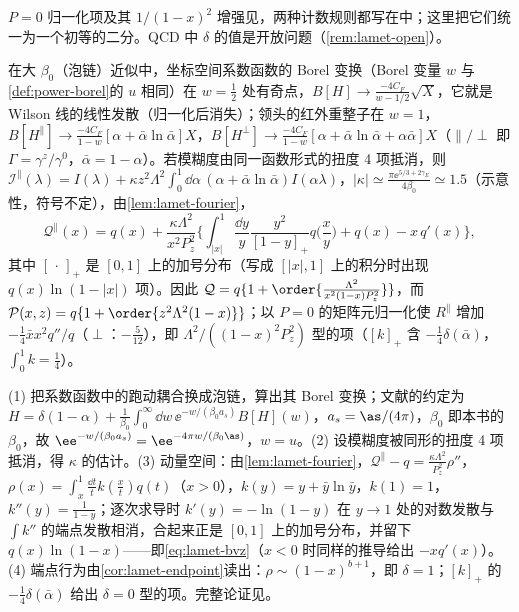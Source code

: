 $P=0$ 归一化项及其 $1/(1-x)^2$ 增强见\cite{Braun:2018brg}，两种计数规则都写在\cite{JiEtAl2021}中；这里把它们统一为一个初等的二分。QCD 中 $\delta$ 的值是开放问题（\cref{rem:lamet-open}）。


\begin{proposition}\label{prop:lamet-bvz}
在大 $\beta_0$（泡链）近似中，坐标空间系数函数的 Borel 变换（Borel 变量 $w$ 与\cref{def:power-borel}的 $u$ 相同）在 $w=\frac12$ 处有奇点，$B[H]\to\frac{-4C_F}{w-1/2}\sqrt X$，它就是 Wilson 线的线性发散（归一化后消失）；领头的红外重整子在 $w=1$，$B[H^\parallel]\to\frac{-4C_F}{1-w}[\alpha+\bar\alpha\ln\bar\alpha]X$，$B[H^\perp]\to\frac{-4C_F}{1-w}[\alpha+\bar\alpha\ln\bar\alpha+\alpha\bar\alpha]X$（$\parallel/\perp$ 即 $\Gamma=\gamma^z/\gamma^0$，$\bar\alpha=1-\alpha$）。若模糊度由同一函数形式的扭度 4 项抵消，则 $\mathcal I^\parallel(\lambda)=I(\lambda)+\kappa z^2\Lambda^2\int_0^1\dd\alpha\,(\alpha+\bar\alpha\ln\bar\alpha)I(\alpha\lambda)$，$|\kappa|\simeq\frac{\pi\ee^{5/3+2\gamma_E}}{4\beta_0}\simeq1.5$（示意性，符号不定），由\cref{lem:lamet-fourier}，
\begin{equation}\label{eq:lamet-bvz}
\mathcal Q^\parallel(x)=q(x)+\frac{\kappa\Lambda^2}{x^2P_z^2}\Big\{\int_{|x|}^1\frac{\dd y}y\frac{y^2}{[1-y]_+}q\Big(\frac xy\Big)+q(x)-x\,q'(x)\Big\},
\end{equation}%
其中 $[\,\cdot\,]_+$ 是 $[0,1]$ 上的加号分布（写成 $[|x|,1]$ 上的积分时出现 $q(x)\ln(1-|x|)$ 项）。因此 $\mathcal Q=q\{1+\order{\frac{\Lambda^2}{x^2(1-x)P_z^2}}\}$，而 $\mathcal P(x,z)=q\{1+\order{z^2\Lambda^2(1-x)}\}$；以 $P=0$ 的矩阵元归一化使 $R^\parallel$ 增加 $-\frac14\bar xx^2q''/q$（$\perp$：$-\frac5{12}$），即 $\Lambda^2/((1-x)^2P_z^2)$ 型的项（$[k]_+$ 含 $-\frac14\delta(\bar\alpha)$，$\int_0^1k=\frac14$）。
\end{proposition}

\begin{proofsketch}
(1) 把系数函数中的跑动耦合换成泡链，算出其 Borel 变换\cite{Braun:2018brg}；文献的约定为 $H=\delta(1-\alpha)+\frac1{\beta_0}\int_0^\infty\dd w\,\ee^{-w/(\beta_0a_s)}B[H](w)$，$a_s=\as/(4\pi)$，$\beta_0$ 即本书的 $\beta_0$，故 $\ee^{-w/(\beta_0a_s)}=\ee^{-4\pi w/(\beta_0\as)}$，$w=u$。(2) 设模糊度被同形的扭度 4 项抵消，得 $\kappa$ 的估计。(3) 动量空间：由\cref{lem:lamet-fourier}，$\mathcal Q^\parallel-q=\frac{\kappa\Lambda^2}{P_z^2}\rho''$，$\rho(x)=\int_x^1\frac{\dd t}tk(\frac xt)q(t)$（$x>0$），$k(y)=y+\bar y\ln\bar y$，$k(1)=1$，$k''(y)=\frac1{1-y}$；逐次求导时 $k'(y)=-\ln(1-y)$ 在 $y\to1$ 处的对数发散与 $\int k''$ 的端点发散相消，合起来正是 $[0,1]$ 上的加号分布，并留下 $q(x)\ln(1-x)$——即\cref{eq:lamet-bvz}（$x<0$ 时同样的推导给出 $-xq'(x)$）。(4) 端点行为由\cref{cor:lamet-endpoint}读出：$\rho\sim(1-x)^{b+1}$，即 $\delta=1$；$[k]_+$ 的 $-\frac14\delta(\bar\alpha)$ 给出 $\delta=0$ 型的项。完整论证见\cite{Braun:2018brg}。
\end{proofsketch}

